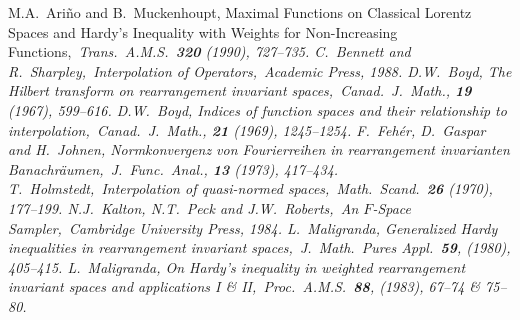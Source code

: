 \begin{thebibliography}{99}

\rm{} M.A.~Ari\~no and
B.~Muckenhoupt, Maximal Functions on Classical Lorentz Spaces
and Hardy's Inequality with Weights for Non-Increasing Functions,\em\
Trans.\ A.M.S.\ {\bf 320} (1990), 727--735.
\rm{} C.~Bennett and R.~Sharpley,\em\ Interpolation of Operators,\rm\
Academic Press, 1988.
\rm\bibitem{m} D.W.~Boyd, The Hilbert transform on rearrangement invariant 
spaces,\em\ Canad.\ J.\ Math., {\bf 19} (1967), 599--616.
\rm\bibitem{c} D.W.~Boyd, Indices of function spaces and their 
relationship to interpolation,\em\ Canad.\ J.\ Math., {\bf 21} (1969), 
1245--1254.
\rm\bibitem{d} F.~Feh\'er, D.~Gaspar and H.~Johnen, Normkonvergenz von
Fourierreihen in rearrangement invarianten Banachr\"aumen,\em\
J.\ Func.\ Anal., {\bf 13} (1973), 417--434.
\rm\bibitem{e} T.~Holmstedt,\rm\ Interpolation of quasi-normed spaces,\em\ Math.\
Scand.\ {\bf 26} (1970), 177--199.
\rm\bibitem{f} N.J.~Kalton, N.T.~Peck and J.W.~Roberts,\em\ An $F$-Space 
Sampler,\rm\
Cambridge University Press, 1984.
\rm\bibitem{g} L.~Maligranda, Generalized Hardy inequalities in rearrangement
invariant spaces,\em\ J.\ Math.\ Pures Appl.\ {\bf 59}, (1980), 405--415.
\rm\bibitem{h} L.~Maligranda, On Hardy's inequality in weighted rearrangement
invariant spaces and applications I \& II,\em\ Proc.\ A.M.S.\ {\bf 88},
(1983), 67--74 \& 75--80.

\end{thebibliography}




